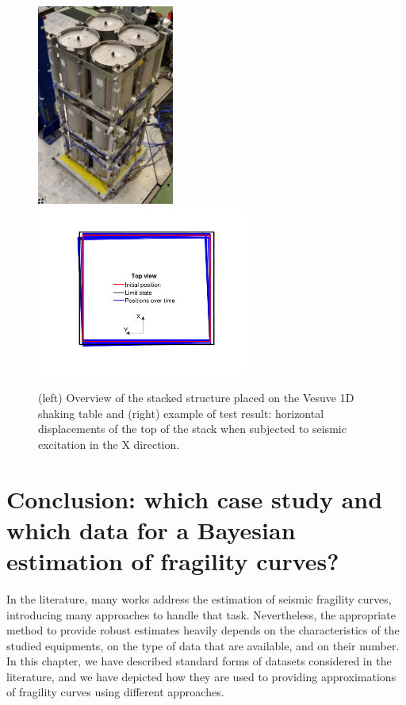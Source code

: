     \begin{figure}[h]
		\centering		
		\includegraphics[width=4.5cm]{figures/intro-frags/EDEN.jpg}
		\hspace{0.5cm}
		\includegraphics[width=7cm]{figures/intro-frags/EDEN_R169.pdf}
		\caption{(left) Overview of the stacked structure placed on the Vesuve 1D shaking table and (right) example of test result: horizontal displacements of the top of the stack when subjected to seismic excitation in the X direction.}
		\label{fig:intro-frags:EDEN}
	\end{figure}  


\section{Conclusion: which case study and which data for a Bayesian estimation of fragility curves?}\label{sec:intro-frags:conclusion}



In the literature, many works address the estimation of seismic fragility curves, introducing many approaches to handle that task.
Nevertheless, the appropriate method to provide robust estimates heavily depends on the characteristics of the studied equipments, on the 
type of data that are available, and on their number.
In this chapter, we have described standard forms of datasets considered in the literature, and we have depicted how they are used to providing approximations of fragility curves using different approaches.

